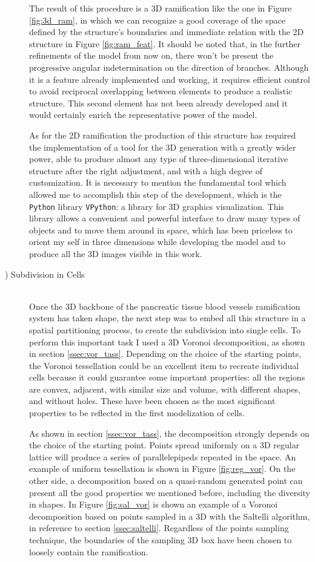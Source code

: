 \begin{description}
    The result of this procedure is a 3D ramification like the one in Figure \ref{fig:3d_ram}, in which we can recognize a good coverage of the space defined by the structure's boundaries and immediate relation with the 2D structure in Figure \ref{fig:ram_feat}. It should be noted that, in the further refinements of the model from now on, there won't be present the progressive angular indetermination on the direction of branches. Although it is a feature already implemented and working, it requires efficient control to avoid reciprocal overlapping between elements to produce a realistic structure. This second element has not been already developed and it would certainly enrich the representative power of the model.

    As for the 2D ramification the production of this structure has required the implementation of a tool for the 3D generation with a greatly wider power, able to produce almost any type of three-dimensional iterative structure after the right adjustment, and with a high degree of customization. It is necessary to mention the fundamental tool which allowed me to accomplish this step of the development, which is the \texttt{Python} library \texttt{VPython}: a library for 3D graphics visualization. This library allows a convenient and powerful interface to draw many types of objects and to move them around in space, which has been priceless to orient my self in three dimensions while developing the model and to produce all the 3D images visible in this work.

    \item [\mycount) Subdivision in Cells] \hfill \\
    Once the 3D backbone of the pancreatic tissue blood vessels ramification system has taken shape, the next step was to embed all this structure in a spatial partitioning process, to create the subdivision into single cells. To perform this important task I used a 3D Voronoi decomposition, as shown in section \ref{ssec:vor_tass}. Depending on the choice of the starting points, the Voronoi tessellation could be an excellent item to recreate individual cells because it could guarantee some important properties: all the regions are convex, adjacent, with similar size and volume, with different shapes, and without holes. These have been chosen as the most significant properties to be reflected in the first modelization of cells.

    As shown in section \ref{ssec:vor_tass}, the decomposition strongly depends on the choice of the starting point. Points spread uniformly on a 3D regular lattice will produce a series of parallelepipeds repeated in the space. An example of uniform tessellation is shown in Figure \ref{fig:reg_vor}. On the other side, a decomposition based on a quasi-random generated point can present all the good properties we mentioned before, including the diversity in shapes. In Figure \ref{fig:sal_vor} is shown an example of a Voronoi decomposition based on points sampled in a 3D with the Saltelli algorithm, in reference to section \ref{ssec:saltelli}. Regardless of the points sampling technique, the boundaries of the sampling 3D box have been chosen to loosely contain the ramification.


\end{description}
